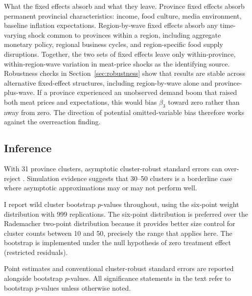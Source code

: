 What the fixed effects absorb and what they leave.
Province fixed effects absorb permanent provincial
characteristics: income, food culture, media environment,
baseline inflation expectations.
Region-by-wave fixed effects absorb any time-varying shock
common to provinces within a region, including aggregate
monetary policy, regional business cycles, and region-specific
food supply disruptions.
Together, the two sets of fixed effects leave only
within-province, within-region-wave variation in meat-price
shocks as the identifying source.
Robustness checks in Section~\ref{sec:robustness} show that
results are stable across alternative fixed-effect structures,
including region-by-wave alone and province-plus-wave.
If a province experienced an unobserved demand boom that
raised both meat prices and expectations, this would bias
$\beta_3$ toward zero rather than away from zero.
The direction of potential omitted-variable bias therefore
works against the overreaction finding.

\subsection{Inference}\label{sec:inference}

With 31 province clusters, asymptotic cluster-robust standard
errors can over-reject \citep{Cameron2008}.
Simulation evidence suggests that 30--50 clusters is a
borderline case where asymptotic approximations may or may not
perform well.

I report wild cluster bootstrap $p$-values throughout, using
the \citet{Webb2023} six-point weight distribution with 999
replications.
The six-point distribution is preferred over the Rademacher
two-point distribution because it provides better size control
for cluster counts between 10 and 50, precisely the range that
applies here.
The bootstrap is implemented under the null hypothesis of
zero treatment effect (restricted residuals).

Point estimates and conventional cluster-robust standard errors
are reported alongside bootstrap $p$-values.
All significance statements in the text refer to bootstrap
$p$-values unless otherwise noted.
